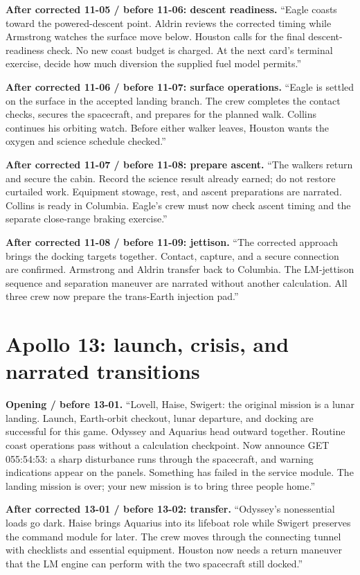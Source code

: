 \textbf{After corrected 11-05 / before 11-06: descent readiness.}
``Eagle coasts toward the powered-descent point. Aldrin reviews the
corrected timing while Armstrong watches the surface move below.
Houston calls for the final descent-readiness check. No new coast
budget is charged. At the next card's terminal exercise, decide how
much diversion the supplied fuel model permits.''

\textbf{After corrected 11-06 / before 11-07: surface operations.}
``Eagle is settled on the surface in the accepted landing branch.
The crew completes the contact checks, secures the spacecraft,
and prepares for the planned walk. Collins continues his orbiting
watch. Before either walker leaves, Houston wants the oxygen
and science schedule checked.''

\textbf{After corrected 11-07 / before 11-08: prepare ascent.}
``The walkers return and secure the cabin. Record the science result
already earned; do not restore curtailed work.
Equipment stowage, rest, and ascent preparations are narrated.
Collins is ready in Columbia. Eagle's crew must now check ascent
timing and the separate close-range braking exercise.''

\textbf{After corrected 11-08 / before 11-09: jettison.}
``The corrected approach brings the docking targets together.
Contact, capture, and a secure connection are confirmed.
Armstrong and Aldrin transfer back to Columbia.
The LM-jettison sequence and separation maneuver are narrated
without another calculation. All three crew now prepare
the trans-Earth injection pad.''

\clearpage
\section*{Apollo 13: launch, crisis, and narrated transitions}
\textbf{Opening / before 13-01.}
``Lovell, Haise, Swigert: the original mission is a lunar landing.
Launch, Earth-orbit checkout, lunar departure, and docking are
successful for this game. Odyssey and Aquarius head outward together.
Routine coast operations pass without a calculation checkpoint.
Now announce GET 055:54:53: a sharp disturbance runs through the
spacecraft, and warning indications appear on the panels.
Something has failed in the service module. The landing mission is
over; your new mission is to bring three people home.''

\textbf{After corrected 13-01 / before 13-02: transfer.}
``Odyssey's nonessential loads go dark.
Haise brings Aquarius into its lifeboat role while Swigert preserves
the command module for later. The crew moves through the connecting
tunnel with checklists and essential equipment.
Houston now needs a return maneuver that the LM engine can perform
with the two spacecraft still docked.''

